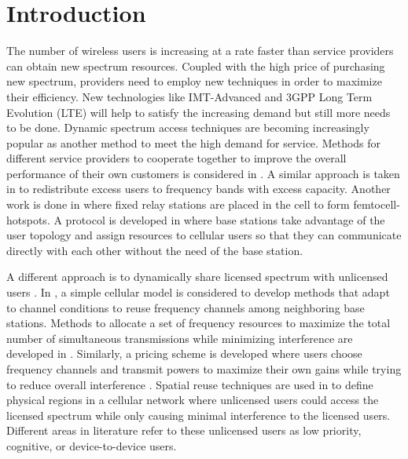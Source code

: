 \documentclass[10pt, final, journal, letterpaper,oneside, twocolumn]{IEEEtran}
\begin{document}
\section{Introduction}
The number of wireless users is increasing at a rate faster than service providers can obtain new spectrum resources.  Coupled with the high price of purchasing new spectrum, providers need to employ new techniques in order to maximize their efficiency.  New technologies like IMT-Advanced and 3GPP Long Term Evolution (LTE) will help to satisfy the increasing demand but still more needs to be done.  Dynamic spectrum access techniques  are becoming increasingly popular as another method to meet the high demand for service.  Methods for different service providers to cooperate together to improve the overall performance of their own customers is considered in \cite{gbmidd1}.  A similar approach is taken in \cite{unused_spectrum} to redistribute excess users to frequency bands with excess capacity.  Another work is done in \cite{chen_cog_GT_resource_femto} where fixed relay stations are placed in the cell to form femtocell-hotspots. A protocol is developed in \cite{gbmiddwpmc07} where base stations take advantage of the user topology and assign resources to cellular users so that they can communicate directly with each other without the need of the base station.  

A different approach is to dynamically share licensed spectrum with unlicensed users \cite{unlic_peha,bkaufman_c3,doppler_d2d_modeselect,doppler_d2d_prospects,doppler_d2d_intjrn}.  In \cite{cellular_goldsmith}, a simple cellular model is considered to develop methods that adapt to channel conditions to reuse frequency channels among neighboring base stations.  Methods to allocate a set of frequency resources to maximize the total number of simultaneous transmissions while minimizing interference are developed in \cite{interference_andrews}.  Similarly, a pricing scheme is developed where users choose frequency channels and transmit powers to maximize their own gains while trying to reduce overall interference \cite{game_theory_resou}.  Spatial reuse techniques are used in \cite{cognitive_kamakaris} to define physical regions in a cellular network where unlicensed users could access the licensed spectrum while only causing minimal interference to the licensed users.  Different areas in literature refer to these unlicensed users as low priority, cognitive, or device-to-device users.  
\end{document}
